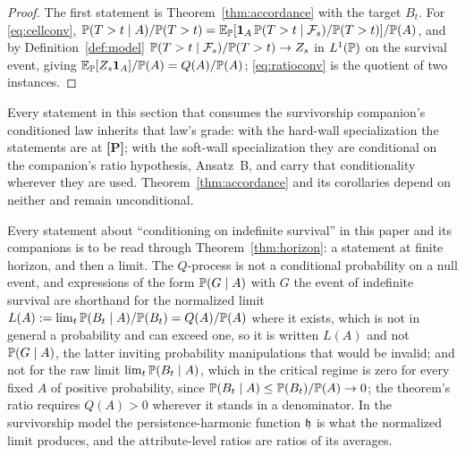 \begin{proof}
The first statement is Theorem~\ref{thm:accordance} with the target
$B_t$. For \eqref{eq:cellconv},
$\mathbb{P}(T>t\mid A)/\mathbb{P}(T>t)=\mathbb{E}_{\mathbb{P}}[\mathbf{1}_A\,\mathbb{P}(T>t\mid\mathcal{F}_s)/\mathbb{P}(T>t)]/\mathbb{P}(A)$,
and by Definition~\ref{def:model} $\mathbb{P}(T>t\mid\mathcal{F}_s)/\mathbb{P}(T>t)\to Z_s$
in $L^1(\mathbb{P})$ on the survival event, giving $\mathbb{E}_{\mathbb{P}}[Z_s\mathbf{1}_A]/\mathbb{P}(A)
=Q(A)/\mathbb{P}(A)$; \eqref{eq:ratioconv} is the quotient of two instances.
\end{proof}

\begin{remark}\label{rem:grades}
Every statement in this section that consumes the survivorship
companion's conditioned law inherits that law's grade: with the
hard-wall specialization the statements are at \textbf{[P]}; with the
soft-wall specialization they are conditional on the companion's ratio
hypothesis, Ansatz~B, and carry that conditionality wherever they are
used. Theorem~\ref{thm:accordance} and its corollaries depend on neither
and remain unconditional.
\end{remark}

\begin{remark}\label{rem:limit}
Every statement about ``conditioning on indefinite survival'' in this
paper and its companions is to be read through Theorem~\ref{thm:horizon}:
a statement at finite horizon, and then a limit. The $Q$-process is not a
conditional probability on a null event, and expressions of the form
$\mathbb{P}(G\mid A)$ with $G$ the event of indefinite survival are shorthand for the normalized limit $L(A) := \lim_t \mathbb{P}(B_t \mid A)/\mathbb{P}(B_t) = Q(A)/\mathbb{P}(A)$ where it exists, which is not in general a probability and can exceed one, so it is written $L(A)$ and not $\mathbb{P}(G \mid A)$, the latter inviting probability manipulations that would be invalid; and not for the raw limit $\lim_t \mathbb{P}(B_t \mid A)$, which in the critical regime is zero for every fixed $A$ of positive probability, since $\mathbb{P}(B_t \mid A) \le \mathbb{P}(B_t)/\mathbb{P}(A) \to 0$; the theorem's ratio requires $Q(A) > 0$ wherever it stands in a denominator. In the survivorship model the persistence-harmonic function $\mathfrak{h}$ is what the normalized limit produces, and
the attribute-level ratios are ratios of its averages.
\end{remark}

